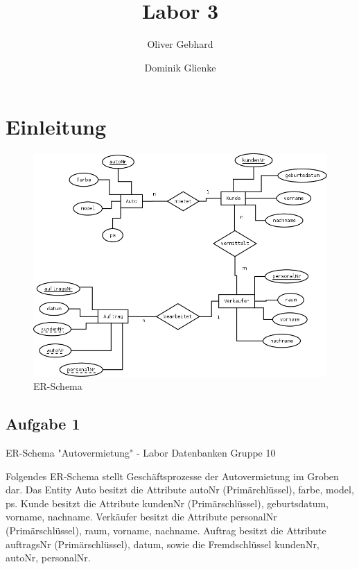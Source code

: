 \documentclass[a4paper,12pt]{article}
\begin{document}
\title{Labor 3}
\author{ Oliver Gebhard \and Dominik Glienke }
\maketitle

\newpage
\tableofcontents
\newpage
\setcounter{tocdepth}{2}


\section{Einleitung}

\begin{figure}[h]
    \centering
    \includegraphics[scale=0.22]{ER_Schema_Autovermietung.png}
    \caption{ER-Schema}
    \label{ER-Schema}
\end{figure}

\subsection{Aufgabe 1}

ER-Schema "Autovermietung" - Labor Datenbanken Gruppe 10

Folgendes ER-Schema stellt Geschäftsprozesse der Autovermietung im Groben dar. 
Das Entity 	Auto besitzt die Attribute autoNr (Primärchlüssel), farbe, model, ps.
		Kunde besitzt die Attribute kundenNr (Primärschlüssel), geburtsdatum, vorname, nachname.
Verkäufer besitzt die Attribute personalNr (Primärschlüssel), raum, vorname, nachname.
Auftrag besitzt die Attribute auftragsNr (Primärschlüssel), datum, sowie die Fremdschlüssel kundenNr, autoNr, personalNr.
\end{document}

